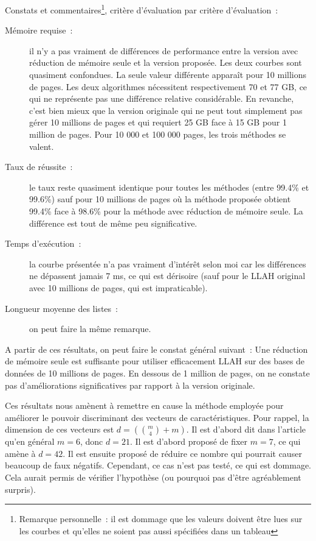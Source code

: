 \documentclass[a4paper]{article}
\begin{document}
Constats et commentaires\footnote{Remarque personnelle~: il est dommage que les valeurs doivent être lues sur les courbes et qu'elles ne soient pas aussi spécifiées dans un tableau}, critère d'évaluation par critère d'évaluation~:
\begin{description}
	\item[Mémoire requise~:] il n'y a pas vraiment de différences de performance entre la version avec réduction de mémoire seule et la version proposée. Les deux courbes sont quasiment confondues. La seule valeur différente apparaît pour 10 millions de pages. Les deux algorithmes nécessitent respectivement 70 et 77 GB, ce qui ne représente pas une différence relative considérable. En revanche, c'est bien mieux que la version originale qui ne peut tout simplement pas gérer 10 millions de pages et qui requiert 25 GB face à 15 GB pour 1 million de pages. Pour 10 000 et 100 000 pages, les trois méthodes se valent.
	\item[Taux de réussite~:] le taux reste quasiment identique pour toutes les méthodes (entre 99.4\% et 99.6\%) sauf pour 10 millions de pages où la méthode proposée obtient 99.4\% face à 98.6\% pour la méthode avec réduction de mémoire seule. La différence est tout de même peu significative.
	\item[Temps d'exécution~:] la courbe présentée n'a pas vraiment d'intérêt selon moi car les différences ne dépassent jamais 7 ms, ce qui est dérisoire (sauf pour le LLAH original avec 10 millions de pages, qui est impraticable).
	\item[Longueur moyenne des listes~:] on peut faire la même remarque.
\end{description}

A partir de ces résultats, on peut faire le constat général suivant~: Une réduction de mémoire seule est suffisante pour utiliser efficacement LLAH sur des bases de données de 10 millions de pages. En dessous de 1 million de pages, on ne constate pas d'améliorations significatives par rapport à la version originale.

Ces résultats nous amènent à remettre en cause la méthode employée pour améliorer le pouvoir discriminant des vecteurs de caractéristiques. Pour rappel, la dimension de ces vecteurs est $d = ({m\choose 4} + m)$. Il est d'abord dit dans l'article qu'en général $m = 6$, donc $d = 21$. Il est d'abord proposé de fixer $m = 7$, ce qui amène à $d = 42$. Il est ensuite proposé de réduire ce nombre qui pourrait causer beaucoup de faux négatifs. Cependant, ce cas n'est pas testé, ce qui est dommage. Cela aurait permis de vérifier l'hypothèse (ou pourquoi pas d'être agréablement surpris).
\end{document}
